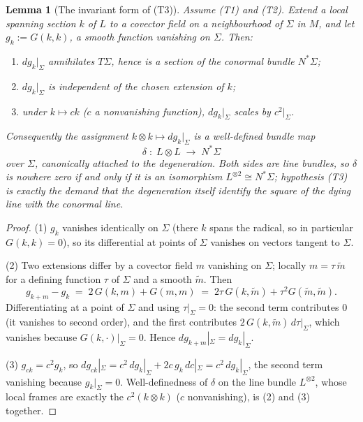 \documentclass[11pt]{article}
\newtheorem{lemma}[theorem]{Lemma}
\theoremstyle{definition}
\newcommand{\shL}{L}
\newcommand{\Sig}{\Sigma}
\begin{document}
\begin{lemma}[The invariant form of (T3)]\label{lem:invariantT2}
Assume (T1) and (T2). Extend a local spanning section $k$ of $\shL$ to a covector field on a neighbourhood of $\Sig$ in $M$, and let $g_k := G(k,k)$, a smooth function vanishing on $\Sig$. Then:
\begin{enumerate}
\item $dg_k|_\Sig$ annihilates $T\Sig$, hence is a section of the conormal bundle $N^*\Sig$;
\item $dg_k|_\Sig$ is independent of the chosen extension of $k$;
\item under $k \mapsto ck$ ($c$ a nonvanishing function), $dg_k|_\Sig$ scales by $c^2|_\Sig$.
\end{enumerate}
Consequently the assignment $k \otimes k \mapsto dg_k|_\Sig$ is a well-defined bundle map
\[
\delta \;:\; \shL \otimes \shL \;\longrightarrow\; N^*\Sig
\]
over $\Sig$, canonically attached to the degeneration. Both sides are line bundles, so $\delta$ is nowhere zero if and only if it is an isomorphism $\shL^{\otimes 2} \cong N^*\Sig$; hypothesis (T3) is exactly the demand that the degeneration itself identify the square of the dying line with the conormal line.
\end{lemma}

\begin{proof}
(1) $g_k$ vanishes identically on $\Sig$ (there $k$ spans the radical, so in particular $G(k,k) = 0$), so its differential at points of $\Sig$ vanishes on vectors tangent to $\Sig$.

(2) Two extensions differ by a covector field $m$ vanishing on $\Sig$; locally $m = \tau\, \tilde m$ for a defining function $\tau$ of $\Sig$ and a smooth $\tilde m$. Then
\[
g_{k + m} - g_k \;=\; 2\,G(k, m) + G(m,m) \;=\; 2\tau\, G(k, \tilde m) + \tau^2 G(\tilde m, \tilde m).
\]
Differentiating at a point of $\Sig$ and using $\tau|_\Sig = 0$: the second term contributes $0$ (it vanishes to second order), and the first contributes $2\,G(k, \tilde m)\, d\tau|_\Sig$, which vanishes because $G(k, \cdot)|_\Sig = 0$. Hence $dg_{k+m}|_\Sig = dg_k|_\Sig$.

(3) $g_{ck} = c^2 g_k$, so $dg_{ck}|_\Sig = c^2\, dg_k|_\Sig + 2c\,g_k\,dc|_\Sig = c^2\, dg_k|_\Sig$, the second term vanishing because $g_k|_\Sig = 0$. Well-definedness of $\delta$ on the line bundle $\shL^{\otimes 2}$, whose local frames are exactly the $c^2 (k \otimes k)$ ($c$ nonvanishing), is (2) and (3) together.
\end{proof}
\end{document}

